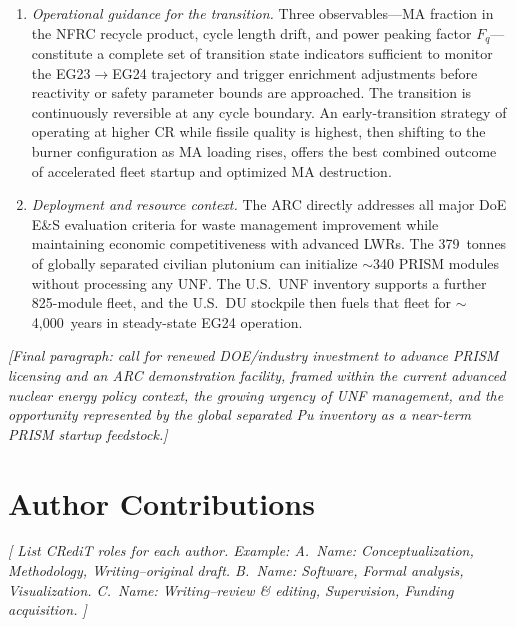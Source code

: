 \documentclass[10pt,twoside]{article}
\newcommand{\placeholder}[1]{%
  \textcolor{placeholder}{\textit{[#1]}}}
\begin{document}
\begin{enumerate}
  \item \textit{Operational guidance for the transition.}
        Three observables---MA fraction in the NFRC recycle product,
        cycle length drift, and power peaking factor $F_q$---constitute
        a complete set of transition state indicators sufficient to
        monitor the EG23$\rightarrow$EG24 trajectory and trigger
        enrichment adjustments before reactivity or safety parameter
        bounds are approached.  The transition is continuously
        reversible at any cycle boundary.  An early-transition strategy
        of operating at higher CR while fissile quality is highest, then
        shifting to the burner configuration as MA loading rises, offers
        the best combined outcome of accelerated fleet startup and
        optimized MA destruction.

  \item \textit{Deployment and resource context.}
        The ARC directly addresses all major DoE E\&S evaluation
        criteria for waste management improvement while maintaining
        economic competitiveness with advanced LWRs.  The 379~tonnes
        of globally separated civilian plutonium can initialize
        $\sim$340 PRISM modules without processing any UNF\@.
        The U.S.\ UNF inventory supports a further 825-module fleet,
        and the U.S.\ DU stockpile then fuels that fleet for
        $\sim$4{,}000~years in steady-state EG24 operation.
\end{enumerate}

\placeholder{Final paragraph: call for renewed DOE/industry investment
  to advance PRISM licensing and an ARC demonstration facility,
  framed within the current advanced nuclear energy policy context,
  the growing urgency of UNF management, and the opportunity
  represented by the global separated Pu inventory as a near-term
  PRISM startup feedstock.}

\section*{Author Contributions}
\placeholder{%
  List CRediT roles for each author.
  Example: A.~Name: Conceptualization, Methodology, Writing--original draft.
  B.~Name: Software, Formal analysis, Visualization.
  C.~Name: Writing--review \& editing, Supervision, Funding acquisition.
}
\end{document}
